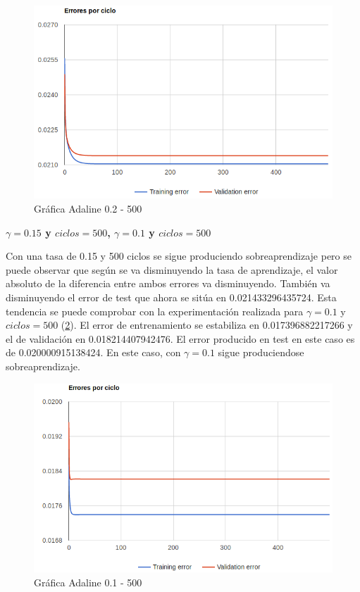 \documentclass[11pt,spanish,listoffigures,listoftables]{workluis}
\begin{document}
\begin{figure}[H]
\centering
\includegraphics[scale=0.5]{2500}
\caption{Gráfica Adaline 0.2 - 500}\label{fig:2500}
\end{figure}

\par \textbf{$\gamma = 0.15$ y $ciclos = 500$, $\gamma = 0.1$ y $ciclos = 500$}

\par Con una tasa de 0.15 y 500 ciclos se sigue produciendo sobreaprendizaje pero se puede observar que según se va disminuyendo la tasa de aprendizaje, el valor absoluto de la diferencia entre ambos errores va disminuyendo. También va disminuyendo el error de test que ahora se sitúa en 0.021433296435724. Esta tendencia se puede comprobar con la experimentación realizada para $\gamma = 0.1$ y $ciclos = 500$ (\ref{fig:1500}). El error de entrenamiento se estabiliza en 0.017396882217266 y el de validación en 0.018214407942476. El error producido en test en este caso es de 0.020000915138424. En este caso, con $\gamma = 0.1$ sigue produciendose sobreaprendizaje.

\begin{figure}[H]
\centering
\includegraphics[scale=0.5]{1500}
\caption{Gráfica Adaline 0.1 - 500}\label{fig:1500}
\end{figure}
\end{document}
